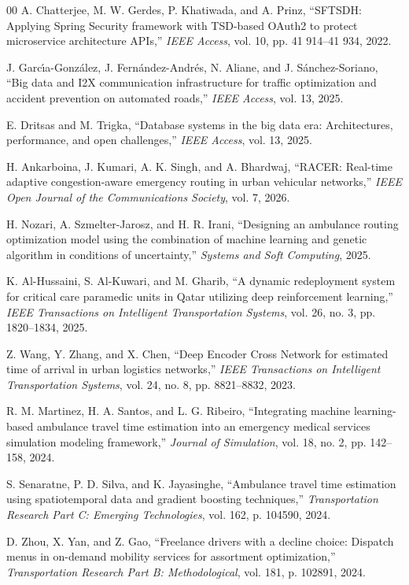 \documentclass[conference]{IEEEtran}
\begin{document}
\begin{thebibliography}{00}
 A. Chatterjee, M. W. Gerdes, P. Khatiwada, and A. Prinz, ``SFTSDH: Applying Spring Security framework with TSD-based OAuth2 to protect microservice architecture APIs,'' \textit{IEEE Access}, vol. 10, pp. 41 914--41 934, 2022.

 J. Garc{\'\i}a-Gonz{\'a}lez, J. Fern{\'a}ndez-Andr{\'e}s, N. Aliane, and J. S{\'a}nchez-Soriano, ``Big data and I2X communication infrastructure for traffic optimization and accident prevention on automated roads,'' \textit{IEEE Access}, vol. 13, 2025.

 E. Dritsas and M. Trigka, ``Database systems in the big data era: Architectures, performance, and open challenges,'' \textit{IEEE Access}, vol. 13, 2025.

 H. Ankarboina, J. Kumari, A. K. Singh, and A. Bhardwaj, ``RACER: Real-time adaptive congestion-aware emergency routing in urban vehicular networks,'' \textit{IEEE Open Journal of the Communications Society}, vol. 7, 2026.

 H. Nozari, A. Szmelter-Jarosz, and H. R. Irani, ``Designing an ambulance routing optimization model using the combination of machine learning and genetic algorithm in conditions of uncertainty,'' \textit{Systems and Soft Computing}, 2025.

 K. Al-Hussaini, S. Al-Kuwari, and M. Gharib, ``A dynamic redeployment system for critical care paramedic units in Qatar utilizing deep reinforcement learning,'' \textit{IEEE Transactions on Intelligent Transportation Systems}, vol. 26, no. 3, pp. 1820--1834, 2025.

 Z. Wang, Y. Zhang, and X. Chen, ``Deep Encoder Cross Network for estimated time of arrival in urban logistics networks,'' \textit{IEEE Transactions on Intelligent Transportation Systems}, vol. 24, no. 8, pp. 8821--8832, 2023.

 R. M. Martinez, H. A. Santos, and L. G. Ribeiro, ``Integrating machine learning-based ambulance travel time estimation into an emergency medical services simulation modeling framework,'' \textit{Journal of Simulation}, vol. 18, no. 2, pp. 142--158, 2024.

 S. Senaratne, P. D. Silva, and K. Jayasinghe, ``Ambulance travel time estimation using spatiotemporal data and gradient boosting techniques,'' \textit{Transportation Research Part C: Emerging Technologies}, vol. 162, p. 104590, 2024.

 D. Zhou, X. Yan, and Z. Gao, ``Freelance drivers with a decline choice: Dispatch menus in on-demand mobility services for assortment optimization,'' \textit{Transportation Research Part B: Methodological}, vol. 181, p. 102891, 2024.
\end{thebibliography}
\end{document}
